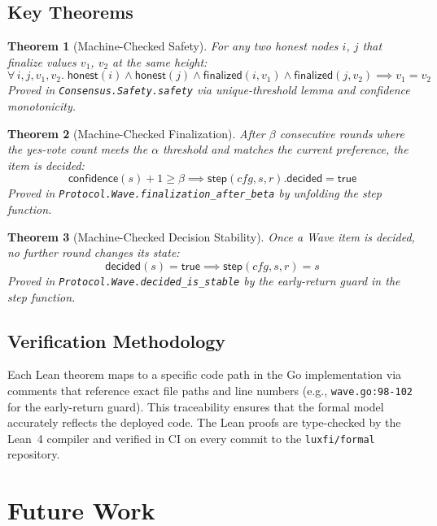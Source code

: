\documentclass[11pt,a4paper]{article}
\newtheorem{theorem}{Theorem}
\begin{document}
\subsection{Key Theorems}

\begin{theorem}[Machine-Checked Safety]
\label{thm:formal-safety}
For any two honest nodes $i$, $j$ that finalize values $v_1$, $v_2$ at the same height:
$$\forall\, i, j, v_1, v_2.\; \mathsf{honest}(i) \land \mathsf{honest}(j) \land \mathsf{finalized}(i, v_1) \land \mathsf{finalized}(j, v_2) \implies v_1 = v_2$$
Proved in \texttt{Consensus.Safety.safety} via unique-threshold lemma and confidence monotonicity.
\end{theorem}

\begin{theorem}[Machine-Checked Finalization]
\label{thm:formal-finalization}
After $\beta$ consecutive rounds where the yes-vote count meets the $\alpha$ threshold and matches the current preference, the item is decided:
$$\mathsf{confidence}(s) + 1 \geq \beta \implies \mathsf{step}(\mathit{cfg}, s, r).\mathsf{decided} = \mathsf{true}$$
Proved in \texttt{Protocol.Wave.finalization\_after\_beta} by unfolding the step function.
\end{theorem}

\begin{theorem}[Machine-Checked Decision Stability]
\label{thm:formal-stability}
Once a Wave item is decided, no further round changes its state:
$$\mathsf{decided}(s) = \mathsf{true} \implies \mathsf{step}(\mathit{cfg}, s, r) = s$$
Proved in \texttt{Protocol.Wave.decided\_is\_stable} by the early-return guard in the step function.
\end{theorem}

\subsection{Verification Methodology}

Each Lean theorem maps to a specific code path in the Go implementation via comments that reference exact file paths and line numbers (e.g., \texttt{wave.go:98-102} for the early-return guard). This traceability ensures that the formal model accurately reflects the deployed code. The Lean proofs are type-checked by the Lean~4 compiler and verified in CI on every commit to the \texttt{luxfi/formal} repository.

\section{Future Work}
\label{sec:future}
\end{document}
